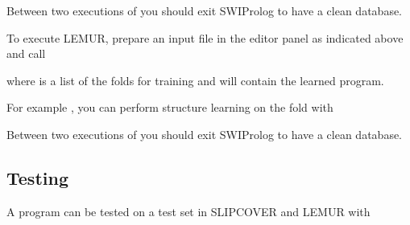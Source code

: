 \documentclass[letterpaper,10pt,english]{sphinxmanual}
\begin{document}
\sphinxAtStartPar
Between two executions of  you should exit SWI\sphinxhyphen{}Prolog to have a clean database.

\sphinxAtStartPar
To execute LEMUR, prepare an input file in the editor panel as indicated above and call

\begin{sphinxVerbatim}[commandchars=\\\{\}]
  
\end{sphinxVerbatim}

\sphinxAtStartPar
where  is a list of the folds for training and  will contain the learned program.

\sphinxAtStartPar
For example , you can perform structure learning on the  fold with

\begin{sphinxVerbatim}[commandchars=\\\{\}]
 \PYG{p}{[}\PYG{p}{]}
\end{sphinxVerbatim}

\sphinxAtStartPar
Between two executions of  you should exit SWI\sphinxhyphen{}Prolog to have a clean database.


\subsection{Testing}
\label{\detokenize{index:testing}}
\sphinxAtStartPar
A program can be tested on a test set in SLIPCOVER and LEMUR with

\begin{sphinxVerbatim}[commandchars=\\\{\}]
  
\end{sphinxVerbatim}
\end{document}
